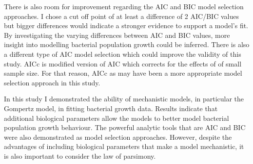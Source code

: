 \documentclass[11pt]{article}
\begin{document}
     There is also room for improvement regarding the AIC and BIC model selection approaches. I chose a cut off point of at least a difference of 2 AIC/BIC values but bigger differences would indicate a stronger evidence to support a model's fit. By investigating the varying differences between AIC and BIC values, more insight into modelling bacterial population growth could be inferred. There is also a different type of AIC model selection which could improve the validity of this study. AICc is modified version of AIC which corrects for the effects of of small sample size. For that reason, AICc as may have been a more appropriate model selection approach in this study.
     
     In this study I demonstrated the ability of mechanistic models, in particular the Gompertz model, in fitting bacterial growth data. Results indicate that additional biological parameters allow the models to better model bacterial population growth behaviour. The powerful analytic tools that are AIC and BIC were also demonstrated as model selection approaches. However, despite the advantages of including biological parameters that make a model mechanistic, it is also important to consider the law of parsimony.
    
    \pagebreak
    
	
	\label{bibsect}
\end{document}
